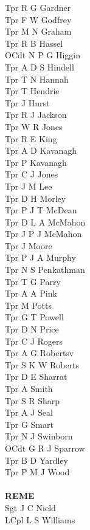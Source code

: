 \begin{multicols}{4}
  Tpr R G Gardner \\
  Tpr F W Godfrey \\
  Tpr M N Graham \\
  Tpr R B Hassel \\
  OCdt N P G Higgin \\
  Tpr A D S Hindell \\
  Tpr T N Hannah \\
  Tpr T Hendrie \\
  Tpr J Hurst \\
  Tpr R J Jackson \\
  Tpr W R Jones \\
  Tpr R E King \\
  Tpr A D Kavanagh \\
  Tpr P Kavanagh \\
  Tpr C J Jones \\
  Tpr J M Lee \\
  Tpr D H Morley \\
  Tpr P J T McDean \\
  Tpr D L A McMahon \\
  Tpr J P J McMahon \\
  Tpr J Moore \\
  Tpr P J A Murphy \\
  Tpr N S Penkathman \\
  Tpr T G Parry \\
  Tpr A A Pink \\
  Tpr M Potts \\
  Tpr G T Powell \\
  Tpr D N Price \\
  Tpr C J Rogers \\
  Tpr A G Robertsv \\
  Tpr S K W Roberts \\
  Tpr D E Sharrat \\
  Tpr A Smith \\
  Tpr S R Sharp \\
  Tpr A J Seal \\
  Tpr G Smart \\
  Tpr N J Swinborn \\
  OCdt G R J Sparrow \\
  Tpr B D Yardley \\
  Tpr P M J Wood \\
  \\
  \textbf{REME} \\
  Sgt J C Nield \\
  LCpl L S Williams \\

\end{multicols}
